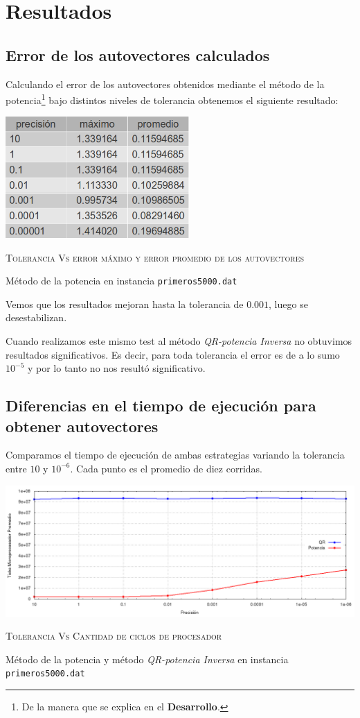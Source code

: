 \section{Resultados}

	\subsection{Error de los autovectores calculados}
		
		Calculando el error de los autovectores obtenidos mediante el m\'etodo
		de la potencia\footnote{De la manera que se explica en el \textbf{Desarrollo}.}
		bajo distintos niveles de tolerancia obtenemos el siguiente resultado:

		\vspace{5mm}
		\centerline{\includegraphics[width=7cm]{img/maxMed.png}}
		\centerline{\textsc{Tolerancia Vs error m\'aximo y error promedio de los autovectores}}
		\centerline{M\'etodo de la potencia en instancia \texttt{primeros5000.dat}}
		\vspace{5mm}

		Vemos que los resultados mejoran hasta la tolerancia de $0.001$, luego se
		desestabilizan.

		Cuando realizamos este mismo test al m\'etodo \textit{QR-potencia Inversa}
		no obtuvimos resultados significativos. Es decir, para toda tolerancia el
		error es de a lo sumo $10^{-5}$ y por lo tanto no nos result\'o significativo.

	\subsection{Diferencias en el tiempo de ejecuci\'on para obtener autovectores}

		Comparamos el tiempo de ejecuci\'on de ambas estrategias variando la tolerancia
		entre $10$ y $10^{-6}$.
		Cada punto es el promedio de diez corridas.

	 	\vspace{5mm}
		\centerline{\includegraphics[width=20cm]{img/precVsTick.png}}
		\centerline{\textsc{Tolerancia Vs Cantidad de ciclos de procesador}}
		\centerline{M\'etodo de la potencia y m\'etodo \textit{QR-potencia Inversa} en instancia
		\texttt{primeros5000.dat}}
		\vspace{5mm}


